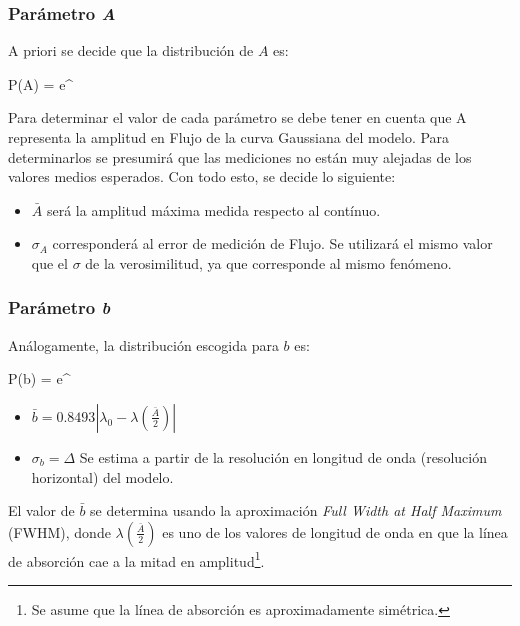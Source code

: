 \documentclass{article}
\begin{document}
\subsubsection{Parámetro \emph{A}}

A priori se decide que la distribución de $A$ es:

\begin{myequation}
P(A) =  e^{}
\label{ec:distr_A}
\end{myequation}

Para determinar el valor de cada parámetro se debe tener en cuenta que A representa la amplitud en Flujo de la curva Gaussiana del modelo. Para determinarlos se presumirá que las mediciones no están muy alejadas de los valores medios esperados. Con todo esto, se decide lo siguiente:

\begin{itemize}
\item $\bar A$ será la amplitud máxima medida respecto al contínuo.

\item $\sigma_A$ corresponderá al error de medición de Flujo. Se utilizará el mismo valor que el $\sigma$ de la verosimilitud, ya que corresponde al mismo fenómeno.
\end{itemize}

\subsubsection{Parámetro \emph{b}}
Análogamente, la distribución escogida para $b$ es:

\begin{myequation}
P(b) =  e^{}
\end{myequation}

\begin{itemize}
\item $\bar b = 0.8493|\lambda_0 - \lambda(\frac{\bar A}{2})|$

\item $\sigma_b = \Delta$ Se estima a partir de la resolución en longitud de onda (resolución horizontal) del modelo.
\end{itemize}

El valor de $\bar b$ se determina usando la aproximación \emph{Full Width at Half Maximum} (FWHM), donde $\lambda(\frac{\bar A}{2})$ es uno de los valores de longitud de onda en que la línea de absorción cae a la mitad en amplitud\footnote{Se asume que la línea de absorción es aproximadamente simétrica.}.
\end{document}
